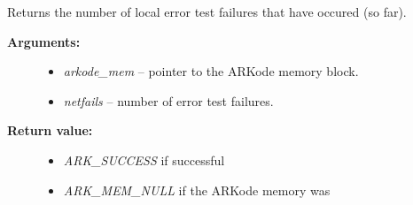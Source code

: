 \documentclass[letterpaper,10pt,english]{sphinxmanual}
\begin{document}
\begin{fulllineitems}
\label{c_interface/User_callable:ARKodeGetNumErrTestFails}
Returns the number of local error test failures that
have occured (so far).
\begin{description}
\item[{\textbf{Arguments:}}] \leavevmode\begin{itemize}
\item {} 
\emph{arkode\_mem} -- pointer to the ARKode memory block.

\item {} 
\emph{netfails} -- number of error test failures.

\end{itemize}

\item[{\textbf{Return value:}}] \leavevmode\begin{itemize}
\item {} 
\emph{ARK\_SUCCESS} if successful

\item {} 
\emph{ARK\_MEM\_NULL} if the ARKode memory was 

\end{itemize}

\end{description}

\end{fulllineitems}

\end{document}
